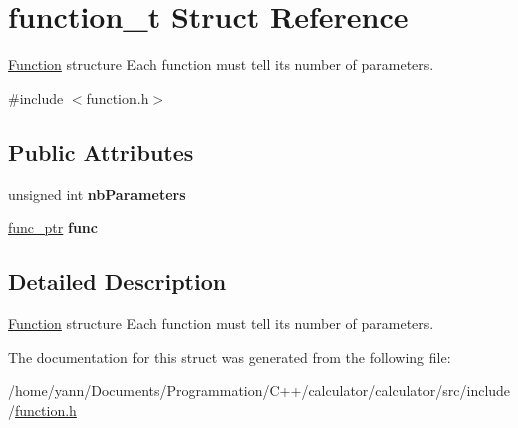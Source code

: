 \hypertarget{structfunction__t}{\section{function\-\_\-t Struct Reference}
\label{structfunction__t}
}


\hyperlink{class_function}{Function} structure Each function must tell its number of parameters.  




{\ttfamily \#include $<$function.\-h$>$}

\subsection*{Public Attributes}
\begin{DoxyCompactItemize}
\item 
\hypertarget{structfunction__t_a647add70a5264bc6bea452726cae9591}{unsigned int {\bfseries nb\-Parameters}}\label{structfunction__t_a647add70a5264bc6bea452726cae9591}

\item 
\hypertarget{structfunction__t_a037cf75435952339d3d885e69eddb87e}{\hyperlink{function_8h_ad31d400be55ada6bfa42b57b42b2a985}{func\-\_\-ptr} {\bfseries func}}\label{structfunction__t_a037cf75435952339d3d885e69eddb87e}

\end{DoxyCompactItemize}


\subsection{Detailed Description}
\hyperlink{class_function}{Function} structure Each function must tell its number of parameters. 

The documentation for this struct was generated from the following file\-:\begin{DoxyCompactItemize}
\item 
/home/yann/\-Documents/\-Programmation/\-C++/calculator/calculator/src/include/\hyperlink{function_8h}{function.\-h}\end{DoxyCompactItemize}
